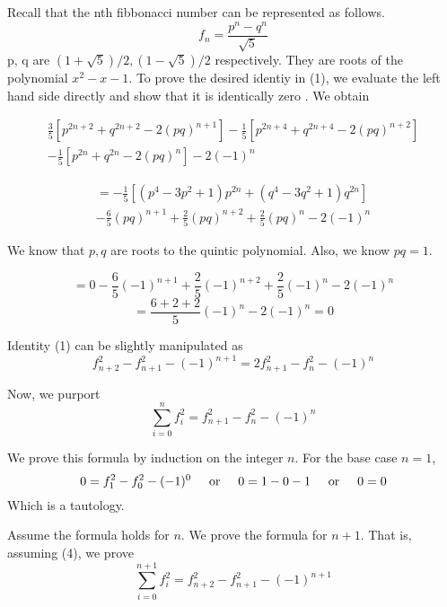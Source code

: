 \documentclass{article}
\newcommand{\textOr}{
    {
        \hspace{5mm}
        \textrm{or}
        \hspace{5mm}
    }
}
\begin{document}
Recall that the nth fibbonacci number can be represented 
as follows.
\[
    f_n = 
    \frac{p^n - q^n} {\sqrt{5}}
\]
p, q are $(1 + \sqrt{5})/2, (1 - \sqrt{5}) /2$ respectively. 
They are roots of the polynomial $ x^2 - x - 1 $.
To prove the desired identiy in (1), we evaluate the 
left hand side directly and show that it is identically zero
. We obtain 

\begin{equation}
    \begin{split}
    \frac 3 {{5}} 
    \left[
        p^{2n + 2} + q^{2n + 2} - 2(pq)^{n + 1}
    \right]
    -\frac 1 {{5}}
    \left[
        p^{2n + 4} + q^{2n + 4} - 2(pq)^{n + 2}
    \right] 
    \\
-\frac 1 {{5}}
    \left[
        p^{2n} + q^{2n} - 2(pq)^{n}
    \right] 
    - 2(-1)^n
    \end{split}
\end{equation}

\begin{equation}
    \begin{split} = 
        -\frac 1{{5}} \left[
                (p^4 - 3p^2 + 1)p^{2n}
+ (q^4 - 3q^2 + 1)q^{2n}
        \right] 
        \\ 
        -\frac 6 5 (pq)^{n + 1} 
        + \frac 2 5 (pq)^{n + 2} 
        + \frac 2 5 (pq)^{n} - 2(-1)^n
    \end{split}
\end{equation}

We know that $p, q$ are roots to the quintic polynomial. 
Also, we know $pq = 1$. 

\[
    = 0 - \frac 6 5 (-1)^{n + 1} 
    + \frac 2 5 (-1)^{n + 2}
    + \frac 2 5 (-1)^{n} - 2(-1)^n
\]
\[=
    \frac{6 + 2 + 2}{5} (-1)^n - 2(-1)^n = 0
\]

Identity (1) can be slightly manipulated as 
\begin{equation}
    f_{n + 2}^2 - f_{n+1}^2 - (-1)^{n+1} 
    = 
    2f_{n + 1}^2 - f_n^2 - (-1)^n
\end{equation}

Now, we purport 
\[
    \boxed{
    \sum_{i = 0}^{n} f_i ^2= f_{n + 1}^2 - f_n^2 - (-1)^n
    }
\]

We prove this formula by induction on the integer $n$. 
For the base case $n=1$, 
\[
0 = f_1^2 - f_0^2 - (-1)^0
\textOr 
0 = 1 - 0 - 1 
\textOr 
0 = 0
\]
Which is a tautology. 

Assume the formula holds for $n$. We prove the formula 
for $n +1$. That is, assuming (4), we prove 
\[
    \sum_{i = 0}^{n + 1} f_i ^2= f_{n + 2}^2 - f_{n + 1}^2 - (-1)^{n + 1}
\]
\end{document}
